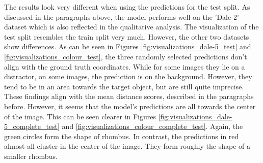 The results look very different when using the predictions for the test split.
As discussed in the paragraphs above, the model performs well on the 'Dale-2' dataset which is also reflected in the qualitative analysis.
The visualization of the test split resembles the train split very much.
However, the other two datasets show differences.
As can be seen in Figures \ref{fig:visualizations_dale-5_test} and \ref{fig:visualizations_colour_test}, the three randomly selected predictions don't align with the ground truth coordinates.
While for some images they lie on a distractor, on some images, the prediction is on the background.
However, they tend to be in an area towards the target object, but are still quite imprecise.
These findings align with the mean distance scores, described in the paragraphs before.
However, it seems that the model's predictions are all towards the center of the image.
This can be seen clearer in Figures \ref{fig:visualizations_dale-5_complete_test} and \ref{fig:visualizations_colour_complete_test}.
Again, the green circles form the shape of rhombus.
In contrast, the predictions in red almost all cluster in the center of the image.
They form roughly the shape of a smaller rhombus.


